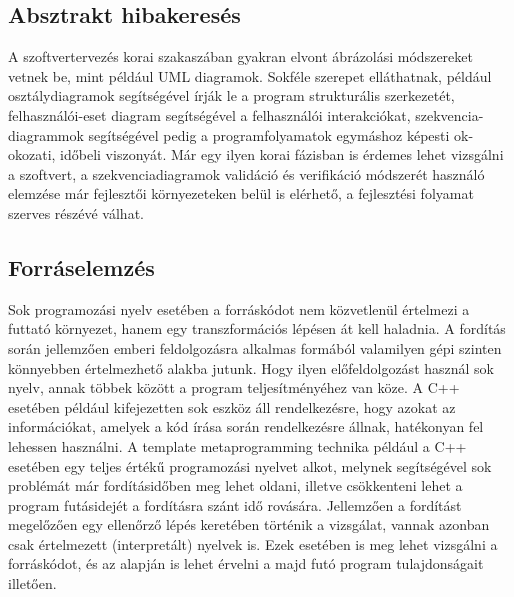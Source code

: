 \documentclass[a4paper,12pt]{report}
\begin{document}
\subsection{Absztrakt hibakeresés}
A szoftvertervezés korai szakaszában gyakran elvont ábrázolási módszereket vetnek be, mint például UML diagramok. Sokféle szerepet elláthatnak, például osztálydiagramok segítségével írják le a program strukturális szerkezetét, felhasználói-eset diagram segítségével a felhasználói interakciókat, szekvencia-diagrammok segítségével pedig a programfolyamatok egymáshoz képesti ok-okozati, időbeli viszonyát. Már egy ilyen korai fázisban is érdemes lehet vizsgálni a szoftvert, a szekvenciadiagramok validáció és verifikáció módszerét használó elemzése  \cite{umlverification} már fejlesztői környezeteken belül is elérhető, a fejlesztési folyamat szerves részévé válhat.

\subsection{Forráselemzés}
Sok programozási nyelv esetében a forráskódot nem közvetlenül értelmezi a futtató környezet, hanem egy transzformációs lépésen át kell haladnia. A fordítás során jellemzően emberi feldolgozásra alkalmas formából valamilyen gépi szinten könnyebben értelmezhető alakba jutunk. Hogy ilyen előfeldolgozást használ sok nyelv, annak többek között a program teljesítményéhez van köze. A C++ esetében például kifejezetten sok eszköz áll rendelkezésre, hogy azokat az információkat, amelyek a kód írása során rendelkezésre állnak, hatékonyan fel lehessen használni. A template metaprogramming technika például a C++ esetében egy teljes értékű programozási nyelvet alkot, melynek segítségével sok problémát már fordításidőben meg lehet oldani, illetve csökkenteni lehet a program futásidejét a fordításra szánt idő rovására.
Jellemzően a fordítást megelőzően egy ellenőrző lépés keretében történik a vizsgálat, vannak azonban csak értelmezett (interpretált) nyelvek is. Ezek esetében is meg lehet vizsgálni a forráskódot, és az alapján is lehet érvelni a majd futó program tulajdonságait illetően.
\end{document}
